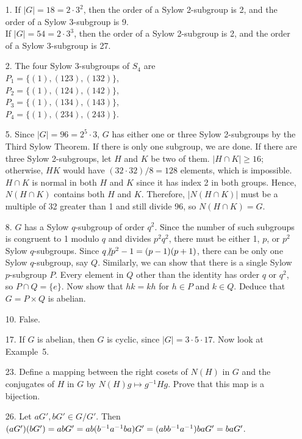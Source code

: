 {\small
\begin{itemize}
 
\item[1.]
If $|G| = 18 = 2 \cdot 3^2$, then the order of a Sylow 2-subgroup is 2,
and the order of a Sylow 3-subgroup is 9. \\
If $|G| = 54 = 2 \cdot 3^3$, then the order of a Sylow 2-subgroup is 2,
and the order of a Sylow 3-subgroup is 27. 
 
 
\item[2.]
The four Sylow 3-subgroups of $S_4$ are \\
$P_1 = \{ (1), (123), (132) \}$,\\
$P_2 = \{ (1), (124), (142) \}$,\\
$P_3 = \{ (1), (134), (143) \}$,\\
$P_4 = \{ (1), (234), (243) \}$.
 
 
\item[5.]
Since $|G| = 96 = 2^5 \cdot 3$, $G$ has either one or three Sylow
2-subgroups by the Third Sylow Theorem. If there is only one subgroup,
we are done. If there are three Sylow 2-subgroups, let $H$ and $K$ be two
of them. $|H \cap K| \geq 16$; otherwise, $HK$ would have $(32 \cdot
32)/8 = 128$ elements, which is impossible. $H \cap K$ is normal in
both $H$ and $K$ since it has index 2 in both groups. Hence, $N(H \cap
K)$ contains both $H$ and $K$. Therefore, $|N(H \cap K)|$ must be a
multiple of 32 greater than 1 and still divide 96, so $N( H \cap K)
= G$. 
 
 
\item[8.]
$G$ has a Sylow $q$-subgroup of order $q^2$. Since the number of such
subgroups is congruent to 1 modulo $q$ and divides $p^2 q^2$, there
must be either 1, $p$, or $p^2$ Sylow $q$-subgroups. 
Since $q {\not{\mid}}
p^2 -1 = (p-1)(p + 1)$, 
there can be only one Sylow $q$-subgroup, say
$Q$. Similarly, we can show that there is a single Sylow $p$-subgroup
$P$. Every element in $Q$ other than the identity has order $q$ or
$q^2$, so $P \cap Q = \{ e \}$. Now show that $hk = kh$ for $h \in P$
and $k \in Q$. Deduce that $G = P \times Q$ is abelian.
 
 
\item[10.]
False.
 
 
\item[17.]
If $G$ is abelian, then $G$ is cyclic, since $|G| = 3 \cdot 5 \cdot
17$. Now look at Example~5.
 
 
\item[23.]
Define a mapping between the right cosets of $N(H)$ in $G$ and the
conjugates of $H$ in $G$ by $N(H) g \mapsto g^{-1} H g$. Prove that
this map is a bijection.
 
 
\item[26.]
Let $a G', b G' \in G/G'$. Then $(a G')( b G') = ab G' =
ab(b^{-1}a^{-1}ba) G' = \\ (abb^{-1}a^{-1})ba G' =  ba G'$.
 
 
 
\end{itemize}
}
 

